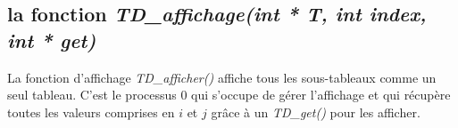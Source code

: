 \subsection*{la fonction \textit{TD\_affichage(int * T, int index, int * get)}}

La fonction d'affichage \textit{TD\_afficher()} affiche tous les sous-tableaux comme un seul tableau. C'est le processus $0$ qui s'occupe de gérer l'affichage et qui récupère toutes les valeurs comprises en $i$ et $j$ grâce à un \textit{TD\_get()} pour les afficher.


